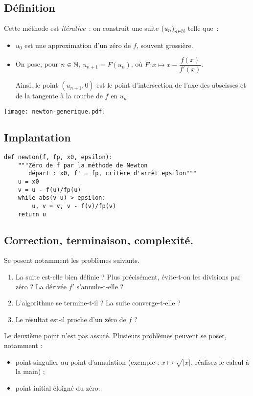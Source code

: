 \subsection{Définition}

Cette méthode est \emph{itérative}~: on construit une suite $\left( u_{n}\right)_{n\in\mathbb{N}}$ telle que~:
\begin{itemize}
\item $u_{0}$ est une approximation d'un zéro de $f$, souvent grossière.
\item On pose, pour $n\in\mathbb{N}$, $u_{n+1}=F(u_{n})$, où 
  $F : x\mapsto x - \dfrac{f(x)}{f'(x)}$.
  
Ainsi, le point $(u_{n+1},0)$ est le point d'intersection de l'axe des abscisses et de la 
tangente à la courbe de $f$ en $u_n$.
\end{itemize}
\begin{center}
 \texttt{[image: newton-generique.pdf]}
\end{center}
\subsection{Implantation}
\begin{lstlisting}
def newton(f, fp, x0, epsilon):
    """Zéro de f par la méthode de Newton
       départ : x0, f' = fp, critère d'arrêt epsilon"""
    u = x0
    v = u - f(u)/fp(u)
    while abs(v-u) > epsilon:
        u, v = v, v - f(v)/fp(v)
    return u
\end{lstlisting}
\subsection{Correction, terminaison, complexité.}

Se posent notamment les problèmes suivants.
\begin{enumerate}
\item La suite est-elle bien définie ? Plus précisément, évite-t-on les divisions par zéro ? La dérivée $f'$ 
s'annule-t-elle ?
\item L'algorithme se termine-t-il ? La suite converge-t-elle ? 
\item Le résultat est-il proche d'un zéro de $f$ ?
\end{enumerate}

\begin{rem}
  Le deuxième point n'est pas assuré. Plusieurs problèmes peuvent se poser, notamment : 
  \begin{itemize}
    \item point singulier au point d'annulation (exemple : $x\mapsto\sqrt{|x|}$, réalisez le calcul à la main) ;
    \item point initial éloigné du zéro.
  \end{itemize}
\end{rem}


